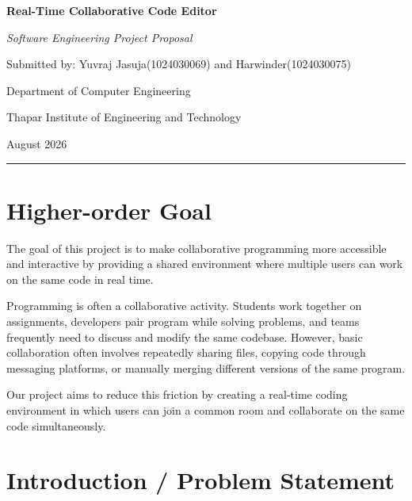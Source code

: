 \documentclass[11pt,letterpaper]{article}
\begin{document}

\begin{center}
    {\LARGE\bfseries Real-Time Collaborative Code Editor}\par
    \vspace{5pt}
    {\large\itshape Software Engineering Project Proposal}\par
    \vspace{10pt}

    {\normalsize Submitted by: Yuvraj Jasuja(1024030069) and Harwinder(1024030075)}\par
    {\normalsize Department of Computer Engineering}\par
    {\normalsize Thapar Institute of Engineering and Technology}\par
    {\normalsize August 2026}
\end{center}

\vspace{7pt}
\hrule
\vspace{5pt}



\section{Higher-order Goal}

The goal of this project is to make collaborative programming more accessible and interactive by providing a shared environment where multiple users can work on the same code in real time.

Programming is often a collaborative activity. Students work together on assignments, developers pair program while solving problems, and teams frequently need to discuss and modify the same codebase. However, basic collaboration often involves repeatedly sharing files, copying code through messaging platforms, or manually merging different versions of the same program.

Our project aims to reduce this friction by creating a real-time coding environment in which users can join a common room and collaborate on the same code simultaneously.



\section{Introduction / Problem Statement}
\end{document}
